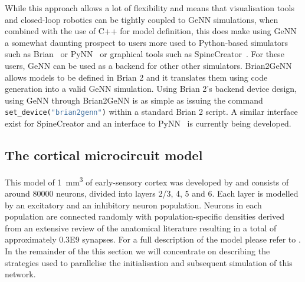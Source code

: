 \documentclass[utf8]{frontiersSCNS} %
\begin{document}


While this approach allows a lot of flexibility and means that visualisation tools and closed-loop robotics can be tightly coupled to GeNN simulations, when combined with the use of C++ for model definition, this does make using GeNN a somewhat daunting prospect to users more used to Python-based simulators such as Brian~\citep{Stimberg2014} or PyNN~\citep{Davison2008a} or graphical tools such as SpineCreator~\citep{Cope2017}.
For these users, GeNN can be used as a backend for other other simulators.
Brian2GeNN~\citep{Stimberg2018} allows models to be defined in Brian 2 and it translates them using code generation into a valid GeNN simulation. 
Using Brian 2's backend device design, using GeNN through Brian2GeNN is as simple as issuing the command \lstinline[language=python]{set_device("brian2genn")} within a standard Brian 2 script. 
A similar interface exist for SpineCreator and an interface to PyNN~\citep{Davison2008a} is currently being developed.

\subsection{The cortical microcircuit model}
\label{sec:method/microcircuit}
This model of \SI{1}{\milli\metre\cubed} of early-sensory cortex was developed by \citet{Potjans2012} and consists of around \num{80000} neurons, divided into layers 2/3, 4, 5 and 6.
Each layer is modelled by an excitatory and an inhibitory neuron population.
Neurons in each population are connected randomly with population-specific densities derived from an extensive review of the anatomical literature resulting in a total of approximately \num{0.3E9} synapses.
For a full description of the model please refer to \citeauthor{Potjans2012}.
In the remainder of the this section we will concentrate on describing the strategies used to parallelise the initialisation and subsequent simulation of this network.
\end{document}
